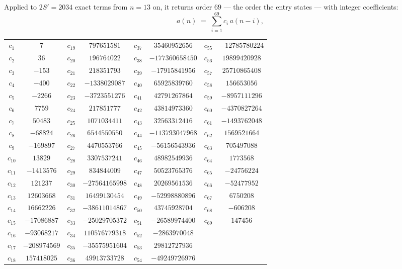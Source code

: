 \documentclass[11pt,a4paper]{article}
\theoremstyle{plain}
\theoremstyle{definition}
\begin{document}
Applied to $2S'=2034$ exact terms from $n=13$ on, it returns order $69$ --- the
order the entry states --- with integer coefficients:
\[
a(n)\;=\;\sum_{i=1}^{69}c_i\,a(n-i),
\]
\begin{center}\small
\begin{tabular}{cccccccc}
$c_{1}$ & $7$ & $c_{19}$ & $797651581$ & $c_{37}$ & $35460952656$ & $c_{55}$ & $-12785780224$ \\
$c_{2}$ & $36$ & $c_{20}$ & $196764022$ & $c_{38}$ & $-177360658450$ & $c_{56}$ & $19899420928$ \\
$c_{3}$ & $-153$ & $c_{21}$ & $218351793$ & $c_{39}$ & $-17915841956$ & $c_{57}$ & $25710865408$ \\
$c_{4}$ & $-400$ & $c_{22}$ & $-1338029087$ & $c_{40}$ & $65925839760$ & $c_{58}$ & $156653056$ \\
$c_{5}$ & $-2266$ & $c_{23}$ & $-3723551276$ & $c_{41}$ & $42791267864$ & $c_{59}$ & $-8957111296$ \\
$c_{6}$ & $7759$ & $c_{24}$ & $217851777$ & $c_{42}$ & $43814973360$ & $c_{60}$ & $-4370827264$ \\
$c_{7}$ & $50483$ & $c_{25}$ & $1071034411$ & $c_{43}$ & $32563312416$ & $c_{61}$ & $-1493762048$ \\
$c_{8}$ & $-68824$ & $c_{26}$ & $6544550550$ & $c_{44}$ & $-113793047968$ & $c_{62}$ & $1569521664$ \\
$c_{9}$ & $-169897$ & $c_{27}$ & $4470553766$ & $c_{45}$ & $-56156543936$ & $c_{63}$ & $705497088$ \\
$c_{10}$ & $13829$ & $c_{28}$ & $3307537241$ & $c_{46}$ & $48982549936$ & $c_{64}$ & $1773568$ \\
$c_{11}$ & $-1413576$ & $c_{29}$ & $834844009$ & $c_{47}$ & $50523765376$ & $c_{65}$ & $-24756224$ \\
$c_{12}$ & $121237$ & $c_{30}$ & $-27564165998$ & $c_{48}$ & $20269561536$ & $c_{66}$ & $-52477952$ \\
$c_{13}$ & $12603668$ & $c_{31}$ & $16499130454$ & $c_{49}$ & $-52998880896$ & $c_{67}$ & $6750208$ \\
$c_{14}$ & $16662226$ & $c_{32}$ & $-38611014867$ & $c_{50}$ & $43745928704$ & $c_{68}$ & $-606208$ \\
$c_{15}$ & $-17086887$ & $c_{33}$ & $-25029705372$ & $c_{51}$ & $-26589974400$ & $c_{69}$ & $147456$ \\
$c_{16}$ & $-93068217$ & $c_{34}$ & $110576779318$ & $c_{52}$ & $-2863970048$ &  &  \\
$c_{17}$ & $-208974569$ & $c_{35}$ & $-35575951604$ & $c_{53}$ & $29812727936$ &  &  \\
$c_{18}$ & $157418025$ & $c_{36}$ & $49913733728$ & $c_{54}$ & $-49249726976$ &  &  \\
\end{tabular}
\end{center}
\end{document}
